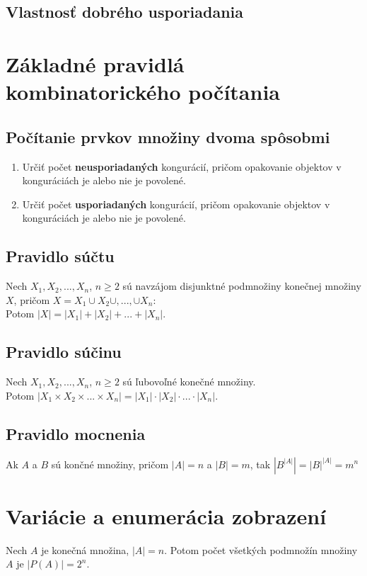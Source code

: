 	\subsection*{Vlastnosť dobrého usporiadania}

\section {Základné pravidlá kombinatorického počítania}
	\subsection*{Počítanie prvkov množiny dvoma spôsobmi}
		\begin{enumerate}
			\item Určiť počet \textbf{neusporiadaných} kongurácií, pričom opakovanie objektov v konguráciách je alebo nie je povolené.
			\item Určiť počet \textbf{usporiadaných} kongurácií, pričom opakovanie objektov v konguráciách je alebo nie je povolené.
		\end{enumerate}
	\subsection*{Pravidlo súčtu}
		Nech $X_{1}, X_{2}, ...,  X_{n}$, $n \geq 2$ sú navzájom disjunktné podmnožiny konečnej množiny $X$, pričom $X = X_{1} \cup X_{2} \cup , ..., \cup X_{n}$: \\
		Potom $|X| = |X_{1}| + |X_{2}| + ... + |X_{n}|$.
	\subsection*{Pravidlo súčinu}
		Nech $X_{1}, X_{2}, ...,  X_{n}$, $n \geq 2$ sú ľubovoľné konečné množiny.\\
		Potom $|X_{1} \times X_{2} \times ... \times X_{n}| = |X_{1}| \cdot |X_{2}| \cdot ... \cdot |X_{n}|$.

	\subsection*{Pravidlo mocnenia}
		Ak $A$ a $B$ sú končné množiny, pričom $|A| = n$ a $|B| = m$, tak $|B^{|A|}| = |B|^{|A|} = m^{n}$

\section {Variácie a enumerácia zobrazení}
	Nech $A$ je konečná množina, $|A| = n$. Potom počet všetkých podmnožín množiny $A$ je $|P(A)| = 2^{n}$.

